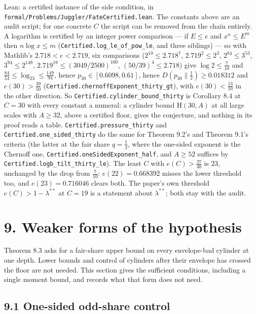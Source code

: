 \documentclass[11pt,a4paper]{article}
\begin{document}
Lean: a certified instance of the side condition, in
\texttt{\nolinkurl{formal/Problems/Juggler/FateCertified.lean}}. The
constants above are an audit script; for one concrete \(C\) the script
can be removed from the chain entirely. A logarithm is certified by an
integer power comparison --- if \(E\le e\) and \(x^n\le E^m\) then
\(n\log x\le m\) (\texttt{\nolinkurl{Certified.log_le_of_pow_le}}, and
three siblings) --- so with Mathlib's \(2.718<e<2.719\), six comparisons
(\(2^{10}\le2.718^{7}\), \(2.719^{2}\le2^{3}\), \(2^{84}\le3^{53}\),
\(3^{94}\le2^{149}\), \(2.719^{19}\le(3049/2500)^{100}\),
\((50/39)^{4}\le2.718\)) give \(\log 2\le\tfrac7{10}\) and
\(\tfrac{84}{53}\le\log_23\le\tfrac{149}{94}\), hence
\(p_{30}\in[0.6098,0.61]\), hence \(D(p_{30}\|\tfrac12)\ge0.018312\) and
\(e(30)>\tfrac{39}{50}\)
(\texttt{\nolinkurl{Certified.chernoffExponent_thirty_gt}}), with
\(e(30)<\tfrac{13}{10}\) in the other direction. So
\texttt{\nolinkurl{Certified.cylinder_bound_thirty}} is Corollary 8.4 at
\(C=30\) with every constant a numeral: a cylinder bound
\(\mathrm H(30,A)\) at all large scales with \(A\ge32\), above a
certified floor, gives the conjecture, and nothing in its proof reads a
table. \texttt{\nolinkurl{Certified.pressure_thirty}} and
\texttt{\nolinkurl{Certified.one_sided_thirty}} do the same for Theorem
9.2's and Theorem 9.1's criteria (the latter at the fair share
\(q=\tfrac12\), where the one-sided exponent is the Chernoff one,
\texttt{\nolinkurl{Certified.oneSidedExponent_half}}, and \(A\ge52\)
suffices by \texttt{\nolinkurl{Certified.logb_tilt_thirty_le}}). The
least \(C\) with \(e(C)>\tfrac{27}{40}\) is \(23\), unchanged by the
drop from \(\tfrac7{10}\): \(e(22)=0.668392\) misses the lower threshold
too, and \(e(23)=0.716046\) clears both. The paper's own threshold
\(e(C)>1-\lambda^{**}\) at \(C=19\) is a statement about
\(\lambda^{**}\); both stay with the audit.

\section{9. Weaker forms of the
hypothesis}\label{weaker-forms-of-the-hypothesis}

Theorem 8.3 asks for a fair-share upper bound on every envelope-bad
cylinder at one depth. Lower bounds and control of cylinders after their
envelope has crossed the floor are not needed. This section gives the
sufficient conditions, including a single moment bound, and records what
that form does not need.

\subsection{9.1 One-sided odd-share
control}\label{one-sided-odd-share-control}
\end{document}
